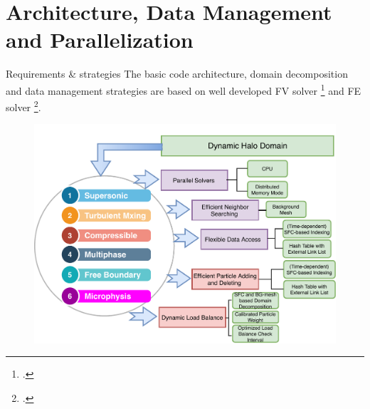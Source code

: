 \documentclass{beamer}
\begin{document}
\section{Architecture, Data Management and Parallelization}
\begin{frame}{Requirements \& strategies}
The basic code architecture, domain decomposition and data management strategies are based on well developed FV solver \footcite{pitman2003computing} and FE solver \footcite{patra2003data}. 
\begin{figure}[!t]
\centering
\includegraphics[width=0.63 \textwidth]{./PPT/Requirement_all}
\label{fig:Requirements}
\end{figure}
\end{frame}
\end{document}
